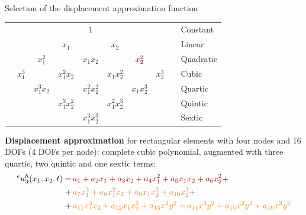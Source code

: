 \documentclass[aspectratio=169]{beamer}
\begin{document}
\begin{frame}{Selection of the displacement approximation function}
  \begin{center}
    \begin{tabular}{ccccccccc|l}
       &                      &                          &                            & \color{darkred}$1$          &                             &                          &                      &  & Constant  \\
       &                      &                          & \color{darkred}$x_1$       &                             & \color{darkred}$x_2$        &                          &                      &  & Linear    \\
       &                      & \color{darkred}$x_1^2$   &                            & \color{darkred}$x_1x_2$     &                             & $\color{darkred}x_2^2$   &                      &  & Quadratic \\
       & \color{brown}$x_1^3$ &                          & \color{brown}$x_1^2x_2$    &                             & \color{brown}$x_1x_2^2$     &                          & \color{brown}$x_2^3$ &  & Cubic     \\
       &                      & \color{orange}$x_1^3x_2$ &                            & \color{orange} $x_1^2x_2^2$ &                             & \color{orange}$x_1x_2^3$ &                      &  & Quartic   \\
       &                      &                          & \color{orange}$x_1^3x_2^2$ &                             & \color{orange} $x_1^2x_2^3$ &                          &                      &  & Quintic   \\
       &                      & \color{orange}           &                            & \color{orange} $x_1^3x_2^3$ &                             &                          &                      &  & Sextic
      \\
    \end{tabular}
  \end{center}
  \begin{block}{}
    \textbf{Displacement approximation} for rectangular elements with four nodes and 16 DOFs (4 DOFs per node): complete cubic polynomial, augmented with three quartic, two quintic and one sextic terms:
    \vspace{-0.2cm}
    \begin{align*}
      {}^eu_3^h (x_1,x_2,t)= & \, {\color{darkred}a_1 + a_2 x_1 + a_3 x_2 + a_4 x_1^2 + a_5 x_1 x_2 + a_6 x_2^2} +                              \\
      +                      & \,{\color{brown} a_7 x_1^3 + a_8 x_1^2 x_2 + a_9 x_1 x_2^2 + a_{10} x_2^3} +                                     \\
      +                      & \,{\color{orange}a_{11} x_1^3 x_2 + a_{12} x_1 x_2^3+a_{13}x^2y^2 + a_{14}x^3y^2 + a_{15}x^2y^3 + a_{16}x^3y^3 }
    \end{align*}
  \end{block}
\end{frame}
\end{document}

